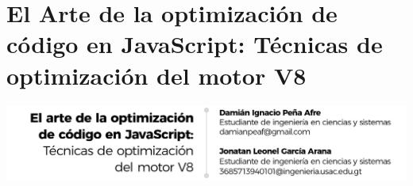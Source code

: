 \documentclass[12pt,spanish,Letterpaper,openany]{book}
\begin{document}
\medskip

\hypertarget{pareja66}{%
\chapter{El Arte de la optimización de código en JavaScript: Técnicas de optimización del motor V8}\label{pareja66}}

\begin{center}\includegraphics[width=1\linewidth]{autores/pareja66_01} \end{center}
\end{document}
